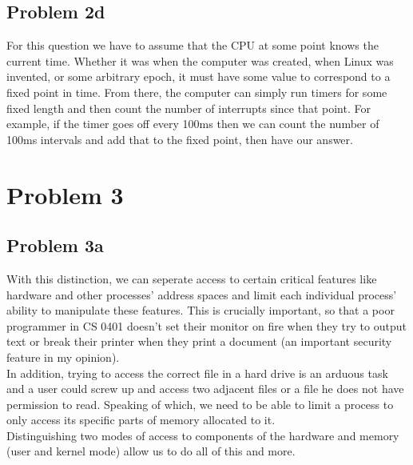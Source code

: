 \documentclass[12pt]{article}
\begin{document}
	\subsection*{Problem 2d}
For this question we have to assume that the CPU at some point knows the current time. Whether it was when the computer was created, when Linux was invented, or some arbitrary epoch, it must have some value to correspond to a fixed point in time. From there, the computer can simply run timers for some fixed length and then count the number of interrupts since that point. For example, if the timer goes off every 100ms then we can count the number of 100ms intervals and add that to the fixed point, then have our answer.

\section*{Problem 3}
	\subsection*{Problem 3a}
With this distinction, we can seperate access to certain critical features like hardware and other processes' address spaces and limit each individual process' ability to manipulate these features. This is crucially important, so that a poor programmer in CS 0401 doesn't set their monitor on fire when they try to output text or break their printer when they print a document (an important security feature in my opinion).\\
In addition, trying to access the correct file in a hard drive is an arduous task and a user could screw up and access two adjacent files or a file he does not have permission to read. Speaking of which, we need to be able to limit a process to only access its specific parts of memory allocated to it.\\
Distinguishing two modes of access to components of the hardware and memory (user and kernel mode) allow us to do all of this and more.
\end{document}
